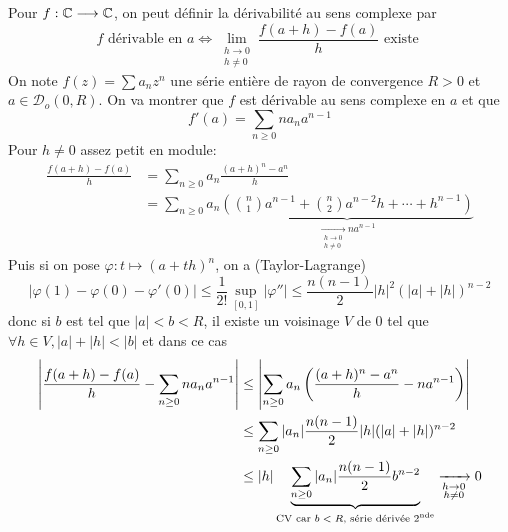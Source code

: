 \begin{rem}
    Pour $f:\mathbb C\longrightarrow \mathbb C$, on peut définir la dérivabilité au sens complexe par \[
        f \text{ dérivable en } a\iff \lim_{\substack{h\to0\\h\neq 0}}\frac{f(a+h)-f(a)}h\text{ existe }
    \]
    On note $f(z)=\sum a_nz^n$ une série entière de rayon de convergence $R>0$ et $a\in\mathcal D_o(0, R)$. On va montrer que $f$ est dérivable au sens complexe en $a$ et que \[
        f'(a)=\sum_{n\geq 0}na_na^{n-1}
    \]
    Pour $h\neq 0$ assez petit en module: 
    \begin{align*}
        \frac{f(a+h)-f(a)}h&=\sum_{n\geq 0}a_n\frac{(a+h)^n-a^n}h\\&=\sum_{n\geq 0}a_n\underbrace{\left(\binom n1a^{n-1}+\binom n2a^{n-2}h+\cdots+h^{n-1}\right)}_{\displaystyle\xrightarrow[\substack{h\to0\\h\neq 0}]{}na^{n-1}}
    \end{align*}
    Puis si on pose $\varphi:t\longmapsto (a+th)^n$, on a (Taylor-Lagrange) \[
        |\varphi(1)-\varphi(0)-\varphi'(0)|\leq \frac1{2!}\sup_{[0,1]}|\varphi''|\leq \frac{n(n-1)}2|h|^2(|a|+|h|)^{n-2}
    \]
    donc si $b$ est tel que $|a|<b<R$, il existe un voisinage $V$ de $0$ tel que $\forall h\in V, |a|+|h|<|b|$ et dans ce cas
    \begin{align*}
        \left|  \frac{f(a+h)-f(a)}h-\sum_{n\geq 0}na_na^{n-1}\right|&\leq \left| \sum_{n\geq 0}a_n \left( \frac{(a+h)^n-a^n}h-na^{n-1} \right) \right| \\
                                                                    &\leq \sum_{n\geq 0}|a_n|\frac{n(n-1)}2|h|(|a|+|h|)^{n-2}\\
                                                                    &\leq |h|\underbrace{\sum_{n\geq 0}|a_n|\frac{n(n-1)}2b^{n-2}}_{\text{CV car $b<R$, série dérivée 2\textsuperscript{nde}}}\xrightarrow[\substack{h\to0\\h\neq 0}]{}0
    \end{align*}
\end{rem}

